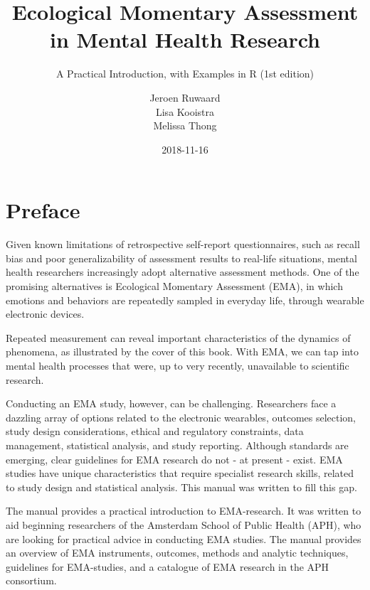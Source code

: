 \documentclass[]{book}
\title{Ecological Momentary Assessment in Mental Health Research}
\subtitle{A Practical Introduction, with Examples in R (1st edition)}
\author{Jeroen Ruwaard \\ Lisa Kooistra \\ Melissa Thong}
\date{2018-11-16}
\let\oldmaketitle\maketitle
\begin{document}
\maketitle

\thispagestyle{empty}


\let\maketitle\oldmaketitle
\maketitle

{
\setcounter{tocdepth}{1}
\tableofcontents
}
\chapter*{Preface}\label{preface}

Given known limitations of retrospective self-report questionnaires,
such as recall bias and poor generalizability of assessment results to
real-life situations, mental health researchers increasingly adopt
alternative assessment methods. One of the promising alternatives is
Ecological Momentary Assessment (EMA), in which emotions and behaviors
are repeatedly sampled in everyday life, through wearable electronic
devices.

Repeated measurement can reveal important characteristics of the
dynamics of phenomena, as illustrated by the cover of this book. With
EMA, we can tap into mental health processes that were, up to very
recently, unavailable to scientific research.

Conducting an EMA study, however, can be challenging. Researchers face a
dazzling array of options related to the electronic wearables, outcomes
selection, study design considerations, ethical and regulatory
constraints, data management, statistical analysis, and study reporting.
Although standards are emerging, clear guidelines for EMA research do
not - at present - exist. EMA studies have unique characteristics that
require specialist research skills, related to study design and
statistical analysis. This manual was written to fill this gap.

The manual provides a practical introduction to EMA-research. It was
written to aid beginning researchers of the Amsterdam School of Public
Health (APH), who are looking for practical advice in conducting EMA
studies. The manual provides an overview of EMA instruments, outcomes,
methods and analytic techniques, guidelines for EMA-studies, and a
catalogue of EMA research in the APH consortium.
\end{document}
